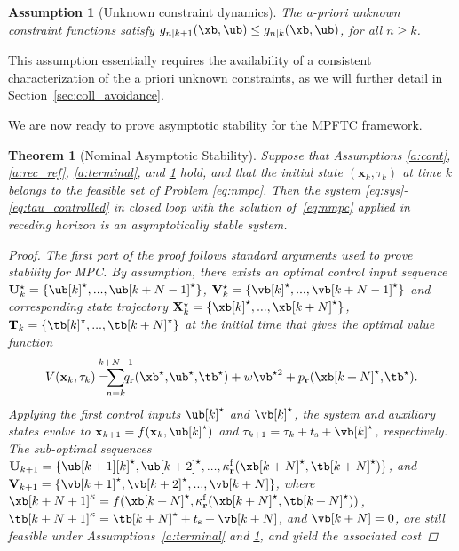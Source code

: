 \documentclass[journal]{IEEEtran}
\newcommand{\x}{{\mathbf{x}}}
\renewcommand{\r}{{\mathbf{r}}}
\newcommand{\review}[1]{#1}
\newtheorem{Theorem}{Theorem}
\newtheorem{Assumption}{Assumption}
\begin{document}
	\begin{Assumption}[Unknown constraint dynamics] \label{a:unknown_constraints}		
		The a-priori unknown constraint functions satisfy $g_{n|k+1}(\xb,\ub) \leq g_{n|k}(\xb,\ub)$, for all $n\geq k$.
	\end{Assumption}
	\review{This assumption essentially requires the availability of a consistent characterization of the a priori unknown constraints, as we will further detail in Section~\ref{sec:coll_avoidance}.}
	
	We are now ready to prove asymptotic stability for the MPFTC framework.
	\begin{Theorem} [Nominal Asymptotic Stability]\label{prop:stab_feas}
		Suppose that Assumptions \ref{a:cont}, \ref{a:rec_ref}, \ref{a:terminal}, and \ref{a:unknown_constraints} hold, 
		and that the initial state $(\x_k,\tau_k)$ at time $k$ belongs to the feasible set of Problem \eqref{eq:nmpc}. Then the system \eqref{eq:sys}-\eqref{eq:tau_controlled} in closed loop with the solution of~\eqref{eq:nmpc} applied in receding horizon is an asymptotically stable system. \label{prop:stable}
		\begin{proof}
		    The first part of the proof follows standard arguments used to prove stability for MPC.
			By assumption, there exists an optimal control input sequence $\mathbf{U}^\star_k=\{\ub[k]^\star,...,\ub[k+N-1]^\star\}$, $\mathbf{V}^\star_k=\{\vb[k]^\star,...,\vb[k+N-1]^\star\}$ and corresponding state trajectory $\mathbf{X}_k^\star = \{\xb[k]^\star,...,\xb[k+N]^\star\}$, $\mathbf{T}_k=\{\tb[k]^\star,...,\tb[k+N]^\star\}$ at the initial time that gives the optimal value function 
			\begin{equation*}
			V(\x_k,\tau_k)=\hspace{-1.1em}\sum_{n=k}^{k+N-1}\hspace{-.9em}q_\r(\xb^\star,\hspace{-0.1em}\ub^\star,\hspace{-0.1em}\tb^\star) + w\vb^{\star{}2}+p_\r(\xb[k+N]^\star,\hspace{-0.1em}\tb^\star).
			\end{equation*}
			Applying the first control inputs $\ub[k]^\star$ and $\vb[k]^\star$, the system and auxiliary states evolve to $\x_{k+1} = f(\x_k,\ub[k]^\star)$ and $\tau_{k+1}=\tau_k+t_\mathrm{s}+\vb[k]^\star$, respectively. The sub-optimal sequences $\mathbf{U}_{k+1}=\{\ub[k+1][k]^\star,\ub[k+2]^\star,...,\kappa^\mathrm{f}_\r(\xb[k+N]^\star,\tb[k+N]^\star)\}$, and $\mathbf{V}_{k+1}=\{\vb[k+1]^\star,\vb[k+2]^\star,...,\vb[k+N]\}$, where $\xb[k+N+1]^\kappa=f(\xb[k+N]^\star,\kappa_\r^\mathrm{f}(\xb[k+N]^\star,\tb[k+N]^\star))$, $\tb[k+N+1]^\kappa=\tb[k+N]^\star+t_\mathrm{s}+\vb[k+N]$, and $\vb[k+N]=0$, are still feasible under Assumptions~\ref{a:terminal} and \ref{a:unknown_constraints}, and yield the associated cost

\end{proof}
\end{Theorem}
\end{document}

